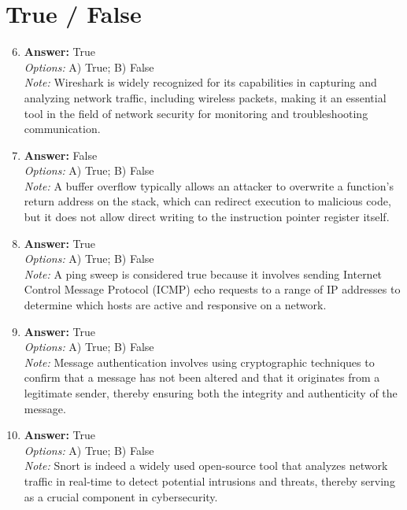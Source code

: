 \documentclass[12pt]{article}
\begin{document}
\section*{True / False}
\begin{enumerate}[label=\arabic*.]
\setcounter{enumi}{5}
\item \textbf{Answer:} True
\\ \textit{Options:} A) True; B) False
\\ \textit{Note:} Wireshark is widely recognized for its capabilities in capturing and analyzing network traffic, including wireless packets, making it an essential tool in the field of network security for monitoring and troubleshooting communication.
\item \textbf{Answer:} False
\\ \textit{Options:} A) True; B) False
\\ \textit{Note:} A buffer overflow typically allows an attacker to overwrite a function's return address on the stack, which can redirect execution to malicious code, but it does not allow direct writing to the instruction pointer register itself.
\item \textbf{Answer:} True
\\ \textit{Options:} A) True; B) False
\\ \textit{Note:} A ping sweep is considered true because it involves sending Internet Control Message Protocol (ICMP) echo requests to a range of IP addresses to determine which hosts are active and responsive on a network.
\item \textbf{Answer:} True
\\ \textit{Options:} A) True; B) False
\\ \textit{Note:} Message authentication involves using cryptographic techniques to confirm that a message has not been altered and that it originates from a legitimate sender, thereby ensuring both the integrity and authenticity of the message.
\item \textbf{Answer:} True
\\ \textit{Options:} A) True; B) False
\\ \textit{Note:} Snort is indeed a widely used open-source tool that analyzes network traffic in real-time to detect potential intrusions and threats, thereby serving as a crucial component in cybersecurity.
\end{enumerate}
\end{document}
